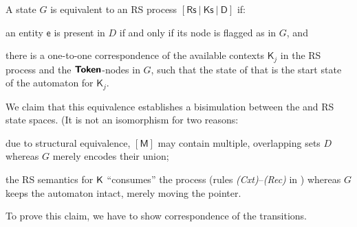A \GROOVE state $G$ is equivalent to an RS process $[\mathsf{\mathsf{Rs}~|~\mathsf{Ks}~|~D}]$ if:
%
\begin{enumerate*}[label=\emph{(\roman*)}]
\item an entity $\mathsf{e}$ is present in $D$ if and only if its \Entity node is flagged as \present in $G$, and
\item there is a one-to-one correspondence of the available contexts $\mathsf{K}_j$ in the RS process and the ${\text{\bfseries\sffamily Token}}$-nodes in $G$, such that the \current state of that \Token is the start state of the automaton for $\mathsf{K}_j$.
\end{enumerate*}

We claim that this equivalence establishes a bisimulation between the \GROOVE and RS state spaces. (It is not an isomorphism for two reasons:
%
\begin{enumerate*}[label=\emph{(\roman*)}]
\item due to structural equivalence, $\mathsf{[M]}$ may contain multiple, overlapping sets $D$ whereas $G$ merely encodes their union;
\item the RS semantics for $\textsf K$ ``consumes'' the process (rules \textit{(Cxt)}--\textit{(Rec)} in ) whereas $G$ keeps the automaton intact, merely moving the \current pointer.
\end{enumerate*}
%
To prove this claim, we have to show correspondence of the transitions.

